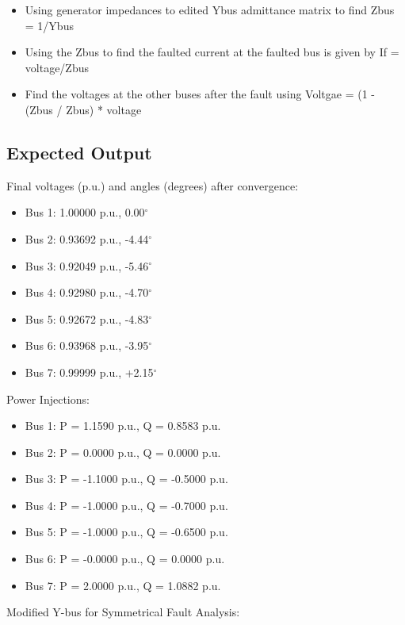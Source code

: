 \documentclass{article}
\begin{document}
	\begin{itemize}
		\item Using generator impedances to edited Ybus admittance matrix to find Zbus = 1/Ybus
		\item Using the Zbus to find the faulted current at the faulted bus is given by If = voltage/Zbus
		\item Find the voltages at the other buses after the fault using Voltgae = (1 - (Zbus / Zbus) * voltage
	\end{itemize}
	
	\subsection{Expected Output}
	Final voltages (p.u.) and angles (degrees) after convergence:
	
	\begin{itemize}
		\item Bus 1: 1.00000 p.u., 0.00$^{\circ}$
		\item Bus 2: 0.93692 p.u., -4.44$^{\circ}$
		\item Bus 3: 0.92049 p.u., -5.46$^{\circ}$
		\item Bus 4: 0.92980 p.u., -4.70$^{\circ}$
		\item Bus 5: 0.92672 p.u., -4.83$^{\circ}$
		\item Bus 6: 0.93968 p.u., -3.95$^{\circ}$
		\item Bus 7: 0.99999 p.u., +2.15$^{\circ}$
	\end{itemize}
	
	\noindent
	Power Injections:
	
	\begin{itemize}
		\item Bus 1: P = 1.1590 p.u., Q = 0.8583 p.u.
		\item Bus 2: P = 0.0000 p.u., Q = 0.0000 p.u.
		\item Bus 3: P = -1.1000 p.u., Q = -0.5000 p.u.
		\item Bus 4: P = -1.0000 p.u., Q = -0.7000 p.u.
		\item Bus 5: P = -1.0000 p.u., Q = -0.6500 p.u.
		\item Bus 6: P = -0.0000 p.u., Q = 0.0000 p.u.
		\item Bus 7: P = 2.0000 p.u., Q = 1.0882 p.u.
	\end{itemize}
	
	\noindent
	Modified Y-bus for Symmetrical Fault Analysis:
	
\end{document}
